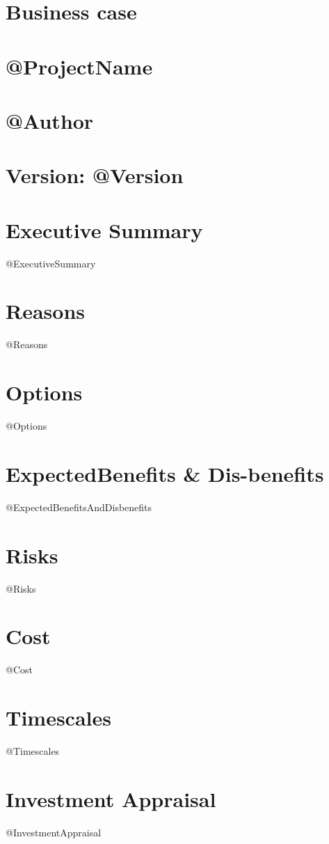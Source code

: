 \documentclass{report}
\begin{document}
\section{Business case}
\section{@ProjectName}
\date{\today}
\section{@Author}
\section{Version: @Version}

\tableofcontents

\newpage


\section{Executive Summary}
@ExecutiveSummary

\section{Reasons}
@Reasons

\section{Options}
@Options

\section{ExpectedBenefits \& Dis-benefits }
@ExpectedBenefitsAndDisbenefits

\section{Risks}
@Risks

\section{Cost}
@Cost

\section{Timescales}
@Timescales

\section{Investment Appraisal}
@InvestmentAppraisal
\end{document}
